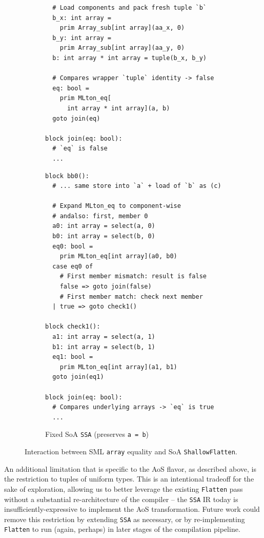 \begin{figure}[htbp]
\begin{subfigure}[t]{0.48\textwidth}
\begin{verbatim}
  # Load components and pack fresh tuple `b`
  b_x: int array =
    prim Array_sub[int array](aa_x, 0)
  b_y: int array =
    prim Array_sub[int array](aa_y, 0)
  b: int array * int array = tuple(b_x, b_y)

  # Compares wrapper `tuple` identity -> false
  eq: bool =
    prim MLton_eq[
      int array * int array](a, b)
  goto join(eq)

block join(eq: bool):
  # `eq` is false
  ...
\end{verbatim}
  \end{subfigure}\hfill
  \begin{subfigure}[t]{0.48\textwidth}
    \caption{Fixed SoA \texttt{SSA} (preserves \texttt{a = b})}
    \label{fig:soa_eq_good}
    \vspace{1mm}
\begin{verbatim}
block bb0():
  # ... same store into `a` + load of `b` as (c)

  # Expand MLton_eq to component-wise
  # andalso: first, member 0
  a0: int array = select(a, 0)
  b0: int array = select(b, 0)
  eq0: bool =
    prim MLton_eq[int array](a0, b0)
  case eq0 of
    # First member mismatch: result is false
    false => goto join(false)
    # First member match: check next member
  | true => goto check1()

block check1():
  a1: int array = select(a, 1)
  b1: int array = select(b, 1)
  eq1: bool =
    prim MLton_eq[int array](a1, b1)
  goto join(eq1)

block join(eq: bool):
  # Compares underlying arrays -> `eq` is true
  ...
\end{verbatim}
  \end{subfigure}

  \caption{Interaction between SML \texttt{array} equality and
  SoA \texttt{ShallowFlatten}.}
  
  \label{fig:soa_eq_lower}
\end{figure}


An additional limitation that is specific to the AoS flavor, as described above,
is the restriction to tuples of uniform types. This is an intentional tradeoff
for the sake of exploration, allowing us to better leverage the
existing \texttt{Flatten} pass without a substantial re-architecture of the
compiler -- the \texttt{SSA} IR today is insufficiently-expressive to implement
the AoS transformation. Future work could remove this restriction by
extending \texttt{SSA} as necessary, or by re-implementing \texttt{Flatten} to
run (again, perhaps) in later stages of the compilation pipeline.

